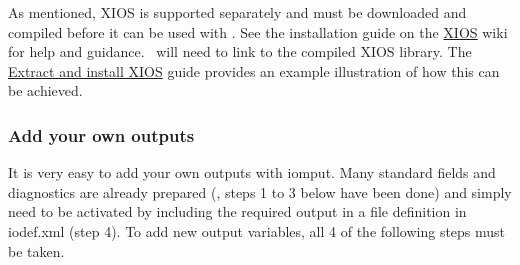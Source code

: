 \documentclass[../main/NEMO_manual]{subfiles}
\begin{document}
As mentioned, XIOS is supported separately and must be downloaded and compiled before it can be used with \NEMO.
See the installation guide on the \href{http://forge.ipsl.jussieu.fr/ioserver/wiki}{XIOS} wiki for help and guidance.
\NEMO\ will need to link to the compiled XIOS library.
The \href{https://forge.ipsl.jussieu.fr/nemo/chrome/site/doc/NEMO/guide/html/install.html#extract-and-install-xios}
{Extract and install XIOS} guide provides an example illustration of how this can be achieved.

\subsubsection{Add your own outputs}

It is very easy to add your own outputs with iomput.
Many standard fields and diagnostics are already prepared (\ie, steps 1 to 3 below have been done) and
simply need to be activated by including the required output in a file definition in iodef.xml (step 4).
To add new output variables, all 4 of the following steps must be taken.
\end{document}
